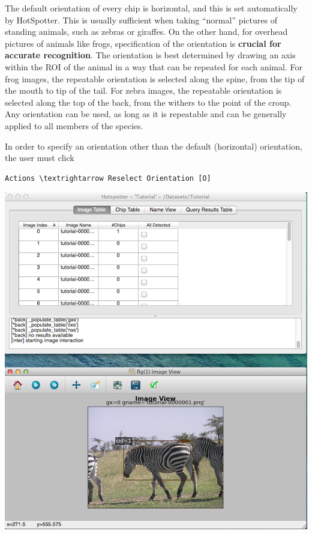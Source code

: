 \documentclass[a4paper,10pt]{article}
\begin{document}
        The default orientation of every chip is horizontal, and this is set
        automatically by HotSpotter.  This is usually sufficient when
        taking ``normal'' pictures of standing
        animals, such as zebras or giraffes.  On the other hand, for overhead
        pictures of animals like frogs, specification of the
        orientation is \textbf{crucial for accurate recognition}.  The
        orientation is best determined by drawing an axis within the
        ROI of the animal in a way that can be repeated for each
        animal.  For frog images, the repeatable orientation is selected along the spine, from the tip of the mouth to tip of the tail.  For zebra images, the repeatable orientation is 
	selected along the top of the back, from the withers to the point of the croup.  Any orientation can be used, as long as it is repeatable and can be generally applied to all members of the species. 

 	\;
        
	In order to specify an orientation other than the default
        (horizontal) orientation, the user must click
        \begin{Verbatim}[commandchars=\\\{\}]
        Actions \textrightarrow Reselect Orientation [O]
        \end{Verbatim}
        \begin{center}
            \includegraphics[scale=0.13]{images/image.png}
        \end{center}
\end{document}
